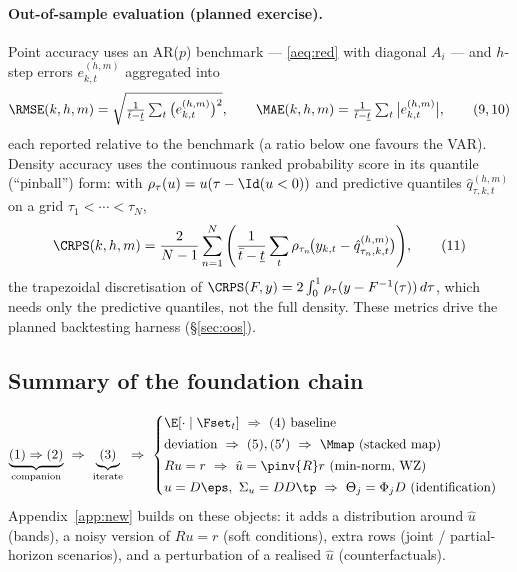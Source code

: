 \paragraph{Out-of-sample evaluation (planned exercise).} Point accuracy uses an
AR($p$) benchmark --- \eqref{aeq:red} with diagonal $A_i$ --- and $h$-step errors
$e^{(h,m)}_{k,t}$ aggregated into
\begin{equation}
\RMSE(k,h,m)=\sqrt{\tfrac{1}{\bar t-\underline t}\textstyle\sum_t\big(e^{(h,m)}_{k,t}\big)^2},
\qquad
\MAE(k,h,m)=\tfrac{1}{\bar t-\underline t}\textstyle\sum_t\big|e^{(h,m)}_{k,t}\big|,
\tag{9,\,10}\label{aeq:rmse}
\end{equation}
each reported relative to the benchmark (a ratio below one favours the VAR).
Density accuracy uses the continuous ranked probability score in its quantile
(``pinball'') form: with $\rho_\tau(u)=u(\tau-\Id(u<0))$ and predictive quantiles
$\hat q^{(h,m)}_{\tau,k,t}$ on a grid $\tau_1<\cdots<\tau_N$,
\begin{equation}
\CRPS(k,h,m)=\frac{2}{N-1}\sum_{n=1}^{N}
\Bigg(\frac{1}{\bar t-\underline t}\sum_{t}\rho_{\tau_n}\!\big(y_{k,t}-\hat q^{(h,m)}_{\tau_n,k,t}\big)\Bigg),
\tag{11}\label{aeq:crps}
\end{equation}
the trapezoidal discretisation of
$\CRPS(F,y)=2\int_0^1\rho_\tau(y-F^{-1}(\tau))\,d\tau$, which needs only the
predictive quantiles, not the full density. These metrics drive the planned
backtesting harness (\S\ref{sec:oos}).

\subsection*{Summary of the foundation chain}
\[
\underbrace{(1)\Rightarrow(2)}_{\text{companion}}
\ \Rightarrow\
\underbrace{(3)}_{\text{iterate}}
\ \Rightarrow\
\begin{cases}
\E[\cdot\mid\Fset_t]\ \Rightarrow\ (4)\ \text{baseline}\\[2pt]
\text{deviation}\ \Rightarrow\ (5),(5')\ \Rightarrow\ \Mmap\ \text{(stacked map)}\\[2pt]
Ru=r\ \Rightarrow\ \hat u=\pinv{R}r\ \text{(min-norm, WZ)}\\[2pt]
u=D\eps,\ \Sigma_u=DD\tp\ \Rightarrow\ \Theta_j=\Phi_jD\ \text{(identification)}
\end{cases}
\]
Appendix~\ref{app:new} builds on these objects: it adds a distribution around
$\hat u$ (bands), a noisy version of $Ru=r$ (soft conditions), extra rows (joint /
partial-horizon scenarios), and a perturbation of a realised $\hat u$
(counterfactuals).
